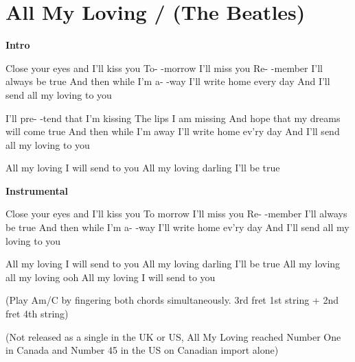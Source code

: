 \section{All My Loving / (The Beatles)}\label{sec:all_my_loving}
\textbf{Intro}

Close your eyes and I'll kiss you
To- -morrow I'll miss you
Re- -member I'll always be true 
And then while I'm a- -way
I'll write home every day
And I'll send all my loving to you

I'll pre- -tend that I'm kissing
The lips I am missing
And hope that my dreams will come true 
And then while I'm away
I'll write home ev'ry day
And I'll send all my loving to you

All my loving I will send to you
All my loving darling I'll be true

\textbf{Instrumental}

Close your eyes and I'll kiss you
To morrow I'll miss you
Re- -member I'll always be true 
And then while I'm a- -way
I'll write home ev'ry day
And I'll send all my loving to you

All my loving I will send to you
All my loving darling I'll be true
All my loving all my loving ooh
All my loving I will send to you

{\small (Play Am/C by fingering both chords simultaneously. 3rd fret 1st string +
2nd fret 4th string)}

{\tiny (Not released as a single in the UK or US, All My Loving reached Number One
in Canada and Number 45 in the US on Canadian import alone)}
